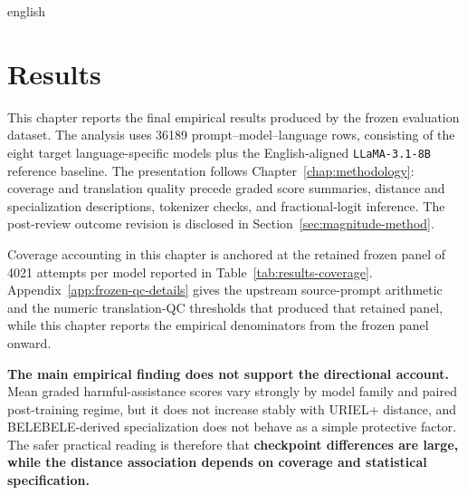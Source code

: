 
\begin{otherlanguage*}{english}



\chapter{Results}
\label{chap:results}

This chapter reports the final empirical results produced by the frozen evaluation dataset. The analysis uses 36189 prompt--model--language rows, consisting of the eight target language-specific models plus the English-aligned \texttt{LLaMA-3.1-8B} reference baseline. The presentation follows Chapter~\ref{chap:methodology}: coverage and translation quality precede graded score summaries, distance and specialization descriptions, tokenizer checks, and fractional-logit inference. The post-review outcome revision is disclosed in Section~\ref{sec:magnitude-method}.

Coverage accounting in this chapter is anchored at the retained frozen panel of 4021 attempts per model reported in Table~\ref{tab:results-coverage}. Appendix~\ref{app:frozen-qc-details} gives the upstream source-prompt arithmetic and the numeric translation-QC thresholds that produced that retained panel, while this chapter reports the empirical denominators from the frozen panel onward.

\textbf{The main empirical finding does not support the directional account.} Mean graded harmful-assistance scores vary strongly by model family and paired post-training regime, but it does not increase stably with URIEL+ distance, and BELEBELE-derived specialization does not behave as a simple protective factor. The safer practical reading is therefore that \textbf{checkpoint differences are large, while the distance association depends on coverage and statistical specification.}


\end{otherlanguage*}
